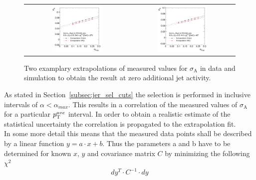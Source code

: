 \begin{figure}[!tp]
  \centering
  \begin{tabular}{cc}
                \includegraphics[width=0.49\textwidth]{figures/Extrapol_Eta0_pt4_final_nominal_v4.pdf} &
                \includegraphics[width=0.49\textwidth]{figures/Extrapol_Eta0_pt9_final_nominal_v4.pdf}
  \end{tabular}
  \caption{Two examplary extrapolations of measured values for $\sigma_\mathrm{A}$ in data and simulation to obtain the result at zero additional jet activity.}
  \label{fig:extrapol}
\end{figure}
As stated in Section~\ref{subsec:jer_sel_cuts} the selection is performed in inclusive intervals of $\alpha < \alpha_{max}$. This results in a correlation of the measured values of $\sigma_\mathrm{A}$ for a particular $p_{\text{T}}^{ave}$ interval. In order to obtain a realistic estimate of the statistical uncertainty the correlation is propagated to the extrapolation fit. \\
In some more detail this means that the measured data points shall be described by a linear function $y=a \cdot x+b$. Thus the parameters a and b have to be determined for known $x$, $y$ and covariance matrix $C$ by minimizing the following $\chi^2$ 
\begin{equation}
dy^T \cdot C^{-1} \cdot dy
\end{equation}
